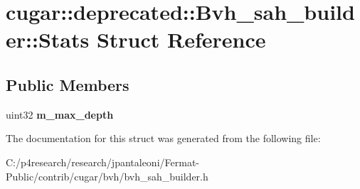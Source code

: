 \hypertarget{structcugar_1_1deprecated_1_1_bvh__sah__builder_1_1_stats}{}\section{cugar\+:\+:deprecated\+:\+:Bvh\+\_\+sah\+\_\+builder\+:\+:Stats Struct Reference}
\label{structcugar_1_1deprecated_1_1_bvh__sah__builder_1_1_stats}
\subsection*{Public Members}
\begin{DoxyCompactItemize}
\item 
\mbox{\label{structcugar_1_1deprecated_1_1_bvh__sah__builder_1_1_stats_aee1625bb6b6f84cf2bdc6dddc2d46128}} 
uint32 {\bfseries m\+\_\+max\+\_\+depth}
\end{DoxyCompactItemize}


The documentation for this struct was generated from the following file\+:\begin{DoxyCompactItemize}
\item 
C\+:/p4research/research/jpantaleoni/\+Fermat-\/\+Public/contrib/cugar/bvh/bvh\+\_\+sah\+\_\+builder.\+h\end{DoxyCompactItemize}
